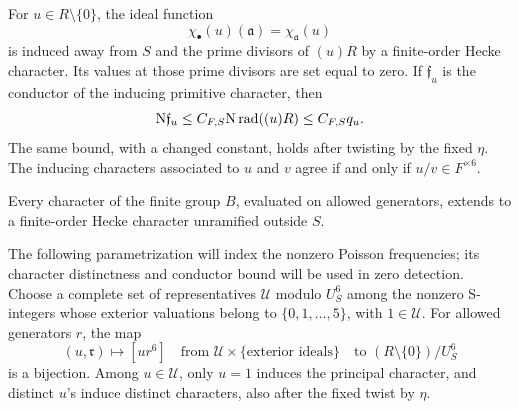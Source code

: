 \begin{lemma}\label{lem:kummer-characters}
For \(u\in R\setminus\{0\}\), the ideal function
\[
 \chi_\bullet(u)(\mathfrak a)=\chi_{\mathfrak a}(u)
\]
is induced away from \(S\) and the prime divisors of \((u)R\) by a
finite-order Hecke character.  Its values at those prime divisors are set
equal to zero.  If \(\mathfrak f_u\) is the conductor of the inducing
primitive character, then
\begin{equation}
 \mathrm{N}\mathfrak f_u\le C_{F,S}\mathrm{N}\operatorname{rad}((u)R)
                       \le C_{F,S}q_u.\label{eq:kummer-conductor}
\end{equation}
The same bound, with a changed constant, holds after twisting by the fixed
\(\eta\).  The inducing characters associated to \(u\) and \(v\) agree if
and only if \(u/v\in F^{\times6}\).

Every character of the finite group \(B\), evaluated on allowed generators,
extends to a finite-order Hecke character unramified outside \(S\).

The following parametrization will index the nonzero Poisson frequencies;
its character distinctness and conductor bound will be used in zero detection.
Choose a complete set of representatives \(\mathcal U\) modulo \(U_S^6\) among the nonzero
S-integers whose exterior valuations belong to \(\{0,1,\ldots,5\}\), with
\(1\in\mathcal U\).  For allowed generators \(r\), the map
\begin{equation}
 (u,\mathfrak r)\longmapsto [u r^6]
 \quad\text{from }\mathcal U\times\{\text{exterior ideals}\}
 \quad\text{to }(R\setminus\{0\})/U_S^6\label{eq:frequency-decomposition}
\end{equation}
is a bijection.  Among \(u\in\mathcal U\), only \(u=1\) induces the
principal character, and distinct \(u\)'s induce distinct characters, also
after the fixed twist by \(\eta\).
\end{lemma}

